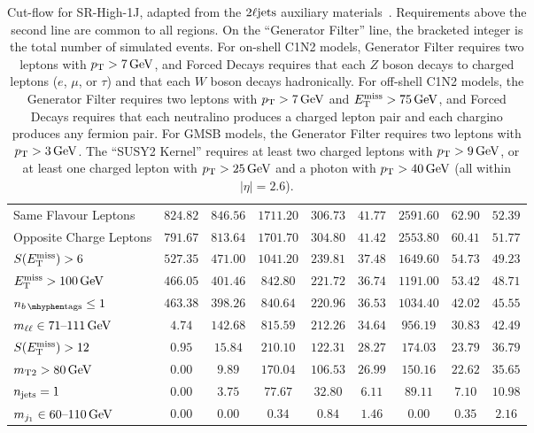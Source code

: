 \begin{sidewaystable}[tp]
{\begin{tabular}{lcccccccc}
Same Flavour Leptons                                       & $824.82$ & $846.56$ & $1711.20$ & $306.73$ & $41.77$ & $2591.60$ & $62.90$ & $52.39$ \\
Opposite Charge Leptons                                   & $791.67$ & $813.64$ & $1701.70$ & $304.80$ & $41.42$ & $2553.80$ & $60.41$ & $51.77$ \\
$\metsig > 6$                                               & $527.35$ & $471.00$ & $1041.20$ & $239.81$ & $37.48$ & $1649.60$ & $54.73$ & $49.23$ \\
$\met > 100\,\eV[G]$                                           & $466.05$ & $401.46$ & $842.80$ & $221.72$ & $36.74$ & $1191.00$ & $53.42$ & $48.71$ \\
\hline
$\nbtag \leq 1$                                          & $463.38$ & $398.26$ & $840.64$ & $220.96$ & $36.53$ & $1034.40$ & $42.02$ & $45.55$ \\
$\mll \in 71\textrm{--}111\,\eV[G]$                            & $4.74$ & $142.68$ & $815.59$ & $212.26$ & $34.64$ & $956.19$ & $30.83$ & $42.49$ \\
$\metsig > 12$                                            & $0.95$ & $15.84$ & $210.10$ & $122.31$ & $28.27$ & $174.03$ & $23.79$ & $36.79$ \\
$\mttwo > 80\,\eV[G]$                                        & $0.00$ & $9.89$ & $170.04$ & $106.53$ & $26.99$ & $150.16$ & $22.62$ & $35.65$ \\
$\njet = 1$                                  & $0.00$ & $3.75$ & $77.67$ & $32.80$ & $6.11$ & $89.11$ & $7.10$ & $10.98$ \\
$\mjetone \in 60\textrm{--}110\,\eV[G]$                             & $0.00$ & $0.00$ & $0.34$ & $0.84$ & $1.46$ & $0.00$ & $0.35$ & $2.16$ \\
\end{tabular}
}
\caption[
Cut-flow for SR-High-1J
]{%
Cut-flow for SR-High-1J,
adapted from the $\twoljets$ auxiliary materials~\cite{hepdata.116034}.
Requirements above the second line are common to all regions.
On the ``Generator Filter'' line, the bracketed integer is the total number of
simulated events.
For on-shell C1N2 models, Generator Filter requires
two leptons with $\pt > 7\,\eV[G]$, and
Forced Decays requires
that each $Z$ boson decays to charged leptons ($e$, $\mu$, or $\tau$)
and that each $W$ boson decays hadronically.
For off-shell C1N2 models, the Generator Filter requires
two leptons with $\pt > 7\,\eV[G]$ and $\met > 75\,\eV[G]$, and
Forced Decays requires
that each neutralino produces a charged lepton pair and each chargino produces
any fermion pair.
For GMSB models, the Generator Filter requires
two leptons with $\pt > 3\,\eV[G]$.
The ``SUSY2 Kernel'' requires at least two charged leptons with
$\pt > 9\,\eV[G]$, or at least one charged lepton with
$\pt > 25\,\eV[G]$ and a photon with $\pt > 40\,\eV[G]$
(all within $|\eta|=2.6$).
}
\label{aux:ewk:cutflowSRHigh4}
\end{sidewaystable}

